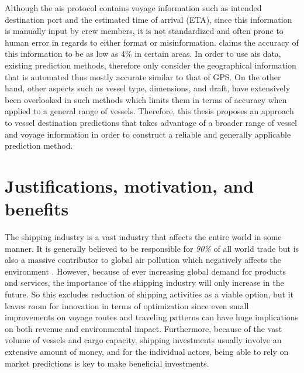 Although the \acrshort{ais} protocol contains voyage information such as intended destination port and the estimated time of arrival (ETA), since this information is manually input by crew members, it is not standardized and often prone to human error in regards to either format or misinformation. \cite{mestl2016} claims the accuracy of this information to be as low as 4\% in certain areas. In order to use \acrshort{ais} data, existing prediction methods, therefore only consider the geographical information that is automated thus mostly accurate similar to that of GPS\@. On the other hand, other aspects such as vessel type, dimensions, and draft, have extensively been overlooked in such methods which limits them in terms of accuracy when applied to a general range of vessels. Therefore, this thesis proposes an approach to vessel destination predictions that takes advantage of a broader range of vessel and voyage information in order to construct a reliable and generally applicable prediction method.

\section{Justifications, motivation, and benefits}
\label{section:justifications_motivations_benefits}

The shipping industry is a vast industry that affects the entire world in some manner. It is generally believed to be responsible for \textit{90\%} of all world trade \parencite{grote2016} but is also a massive contributor to global air pollution which negatively affects the environment \parencite{zheng2016:online}. However, because of ever increasing global demand for products and services, the importance of the shipping industry will only increase in the future. So this excludes reduction of shipping activities as a viable option, but it leaves room for innovation in terms of optimization since even small improvements on voyage routes and traveling patterns can have huge implications on both revenue and environmental impact. Furthermore, because of the vast volume of vessels and cargo capacity, shipping investments usually involve an extensive amount of money, and for the individual actors, being able to rely on market predictions is key to make beneficial investments. 

